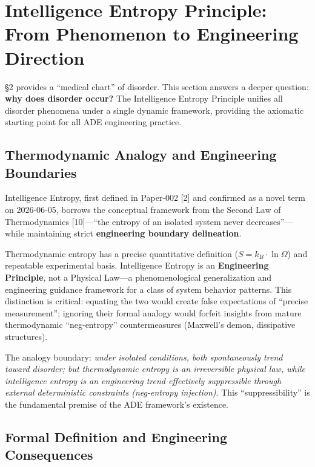 \documentclass[11pt,a4paper]{article}
\begin{document}
\section{Intelligence Entropy Principle: From Phenomenon to Engineering Direction}
\label{sec:entropy}

\S2 provides a ``medical chart'' of disorder. This section answers a deeper question: \textbf{why does disorder occur?} The Intelligence Entropy Principle unifies all disorder phenomena under a single dynamic framework, providing the axiomatic starting point for all ADE engineering practice.

\subsection{Thermodynamic Analogy and Engineering Boundaries}
\label{sec:analogy}

Intelligence Entropy, first defined in Paper-002 [2] and confirmed as a novel term on 2026-06-05, borrows the conceptual framework from the Second Law of Thermodynamics [10]---``the entropy of an isolated system never decreases''---while maintaining strict \textbf{engineering boundary delineation}.

Thermodynamic entropy has a precise quantitative definition ($S = k_B \cdot \ln \Omega$) and repeatable experimental basis. Intelligence Entropy is an \textbf{Engineering Principle}, not a Physical Law---a phenomenological generalization and engineering guidance framework for a class of system behavior patterns. This distinction is critical: equating the two would create false expectations of ``precise measurement''; ignoring their formal analogy would forfeit insights from mature thermodynamic ``neg-entropy'' countermeasures (Maxwell's demon, dissipative structures).

The analogy boundary: \emph{under isolated conditions, both spontaneously trend toward disorder; but thermodynamic entropy is an irreversible physical law, while intelligence entropy is an engineering trend effectively suppressible through external deterministic constraints (neg-entropy injection)}. This ``suppressibility'' is the fundamental premise of the ADE framework's existence.

\subsection{Formal Definition and Engineering Consequences}
\label{sec:formal-def}
\end{document}
